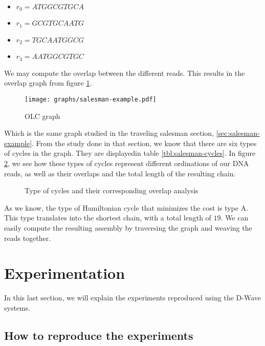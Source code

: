\begin{itemize}
	\item $r_0 = ATGGCGTGCA$
	\item $r_1 = GCGTGCAATG$
	\item $r_2 = TGCAATGGCG$
	\item $r_3 = AATGGCGTGC$
\end{itemize}

We may compute the overlap between the different reads. This results in the overlap graph from figure \ref{fig:overlap-graph}.

\begin{figure}[h]
	\texttt{[image: graphs/salesman-example.pdf]}
	\centering
	\caption{OLC graph}
	\label{fig:overlap-graph}
\end{figure}

Which is the same graph studied in the traveling salesman section, \ref{sec:salesman-example}. From the study done in that section, we know that there are six types of cycles in the graph. They are displayedin table \ref{tbl:salesman-cycles}. In figure \ref{fig:overlap-cycles}, we see how these types of cycles represent different ordinations of our DNA reads, as well as their overlaps and the total length of the resulting chain.

\begin{figure}[h]
	\centering
	\caption{Type of cycles and their corresponding overlap analysis \cite{Sarkar2020}}
	\label{fig:overlap-cycles}
\end{figure}

As we know, the type of Hamiltonian cycle that minimizes the cost is type A. This type translates into the shortest chain, with a total length of $19$. We can easily compute the resulting assembly by traversing the graph and weaving the reads together.


\section{Experimentation}
\label{sec:experimentation}


In this last section, we will explain the experiments reproduced using the D-Wave systems.


\subsection{How to reproduce the experiments}


